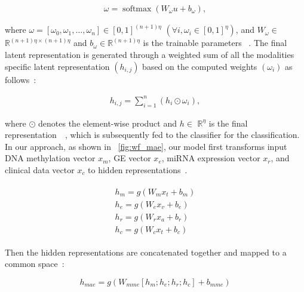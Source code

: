 \vspace{-6mm}
\begin{align}
    \omega=\operatorname{softmax}\left(W_{\omega} u+b_{\omega}\right),
\end{align}

where $\omega=\left[\omega_{0}, \omega_{1}, \ldots, \omega_{n}\right] \in[0,1]^{(n+1) \eta}$ $\left(\forall i, \omega_{i} \in[0,1]^{\eta}\right)$, and  $W_{\omega} \in$
$\mathbb{R}^{(n+1) \eta \times(n+1) \eta}$ and $b_{\omega} \in \mathbb{R}^{(n+1) \eta}$ is the trainable parameters ~\cite{mmdcae}. The final latent representation is generated through a weighted sum of all the modalities specific latent representation $\left(h_{i,j}\right)$ based on the computed weights $\left(\omega_{i}\right)$ as follows~\cite{mmdcae}: 

\vspace{-4mm}
\begin{align}
   h_{i,j}=\sum_{i=1}^{n}\left(h_{i} \odot \omega_{i}\right),
\end{align}

where $\odot$ denotes the element-wise product and $h \in$ $\mathbb{R}^{\eta}$ is the final representation~~\cite{mmdcae}, which is subsequently fed to the classifier for the classification. In our approach, as shown in ~\cref{fig:wf_mae}, our model first transforms input DNA methylation vector $x_m$, GE vector $x_e$, miRNA expression vector $x_r$, and clinical data vector $x_c$ to hidden representations~\cite{wang2018associativemulti}.

\vspace{-4mm}
\begin{align}
    \begin{array}{l}
        {h_{m}=g\left(W_{m} x_{t}+b_{m}\right)} \\
        {h_{e}=g\left(W_{e} x_{v}+b_{e}\right)} \\
        {h_{r}=g\left(W_{r} x_{a}+b_{r}\right)} \\
        {h_{c}=g\left(W_{c} x_{t}+b_{c}\right)}
    \end{array}
    \label{eq:m1}
\end{align}  

Then the hidden representations are concatenated together and mapped to a common space~\cite{liu2016multimodal}:

\vspace{-4mm}
\begin{equation}
    h_{mae}=g\left(W_{mme}\left[h_{m} ; h_{e} ; h_{r} ; h_{c}\right]+b_{mme}\right)
\end{equation}


